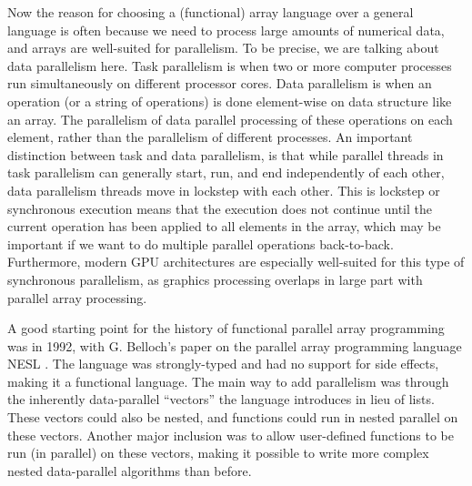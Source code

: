         Now the reason for choosing a (functional) array language over a general language is often because we need to process large amounts of numerical data, and arrays are well-suited for parallelism.
        To be precise, we are talking about data parallelism here.
        Task parallelism is when two or more computer processes run simultaneously on different processor cores.
        Data parallelism is when an operation (or a string of operations) is done element-wise on data structure like an array.
        The parallelism of data parallel processing of these operations on each element, rather than the parallelism of different processes.
        An important distinction between task and data parallelism, is that while parallel threads in task parallelism can generally start, run, and end independently of each other, data parallelism threads move in lockstep with each other.
        This is lockstep or synchronous execution means that the execution does not continue until the current operation has been applied to all elements in the array, which may be important if we want to do multiple parallel operations back-to-back.
        Furthermore, modern GPU architectures are especially well-suited for this type of synchronous parallelism, as graphics processing overlaps in large part with parallel array processing.

        A good starting point for the history of functional parallel array programming was in 1992, with G. Belloch's paper on the parallel array programming language NESL \cite{blelloch1992nesl}.
        The language was strongly-typed and had no support for side effects, making it a functional language.
        The main way to add parallelism was through the inherently data-parallel ``vectors'' the language introduces in lieu of lists.
        These vectors could also be nested, and functions could run in nested parallel on these vectors.
        Another major inclusion was to allow user-defined functions to be run (in parallel) on these vectors, making it possible to write more complex nested data-parallel algorithms than before.

